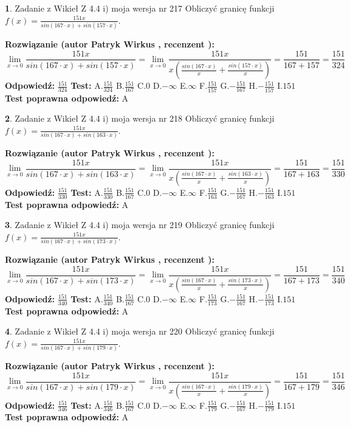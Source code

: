 \documentclass[12pt, a4paper]{article}
\theoremstyle{definition} %
\newtheorem{zad}{}
\newcommand{\zadStart}[1]{\begin{zad}#1\newline}
\newcommand{\zadStop}{\end{zad}}
\newcommand{\rozwStart}[2]{\noindent \textbf{Rozwiązanie (autor #1 , recenzent #2): }\newline}
\newcommand{\rozwStop}{\newline}
\newcommand{\odpStart}{\noindent \textbf{Odpowiedź:}\newline}
\newcommand{\odpStop}{\newline}
\newcommand{\testStart}{\noindent \textbf{Test:}\newline}
\newcommand{\testStop}{\newline}
\newcommand{\kluczStart}{\noindent \textbf{Test poprawna odpowiedź:}\newline}
\newcommand{\kluczStop}{\newline}
\begin{document}
\zadStart{Zadanie z Wikieł Z 4.4 i) moja wersja nr 217}
Obliczyć granicę funkcji $f(x)=\frac{151x}{sin(167\cdot x) +sin(157\cdot x)}$.
\zadStop
\rozwStart{Patryk Wirkus}{}
$$\lim\limits_{x\to 0}\frac{151x}{sin(167\cdot x) +sin(157\cdot x)}=\lim\limits_{x\to 0}\frac{151x}{x(\frac{sin(167\cdot x)}{x}+\frac{sin(157\cdot x)}{x})}=\frac{151}{167+157} = \frac{151}{324}$$
\rozwStop
\odpStart
$\frac{151}{324}$
\odpStop
\testStart
A.$\frac{151}{324}$
B.$\frac{151}{167}$
C.$0$
D.$-\infty$
E.$\infty$
F.$\frac{151}{157}$
G.$-\frac{151}{167}$
H.$-\frac{151}{157}$
I.$151$
\testStop
\kluczStart
A
\kluczStop



\zadStart{Zadanie z Wikieł Z 4.4 i) moja wersja nr 218}
Obliczyć granicę funkcji $f(x)=\frac{151x}{sin(167\cdot x) +sin(163\cdot x)}$.
\zadStop
\rozwStart{Patryk Wirkus}{}
$$\lim\limits_{x\to 0}\frac{151x}{sin(167\cdot x) +sin(163\cdot x)}=\lim\limits_{x\to 0}\frac{151x}{x(\frac{sin(167\cdot x)}{x}+\frac{sin(163\cdot x)}{x})}=\frac{151}{167+163} = \frac{151}{330}$$
\rozwStop
\odpStart
$\frac{151}{330}$
\odpStop
\testStart
A.$\frac{151}{330}$
B.$\frac{151}{167}$
C.$0$
D.$-\infty$
E.$\infty$
F.$\frac{151}{163}$
G.$-\frac{151}{167}$
H.$-\frac{151}{163}$
I.$151$
\testStop
\kluczStart
A
\kluczStop



\zadStart{Zadanie z Wikieł Z 4.4 i) moja wersja nr 219}
Obliczyć granicę funkcji $f(x)=\frac{151x}{sin(167\cdot x) +sin(173\cdot x)}$.
\zadStop
\rozwStart{Patryk Wirkus}{}
$$\lim\limits_{x\to 0}\frac{151x}{sin(167\cdot x) +sin(173\cdot x)}=\lim\limits_{x\to 0}\frac{151x}{x(\frac{sin(167\cdot x)}{x}+\frac{sin(173\cdot x)}{x})}=\frac{151}{167+173} = \frac{151}{340}$$
\rozwStop
\odpStart
$\frac{151}{340}$
\odpStop
\testStart
A.$\frac{151}{340}$
B.$\frac{151}{167}$
C.$0$
D.$-\infty$
E.$\infty$
F.$\frac{151}{173}$
G.$-\frac{151}{167}$
H.$-\frac{151}{173}$
I.$151$
\testStop
\kluczStart
A
\kluczStop



\zadStart{Zadanie z Wikieł Z 4.4 i) moja wersja nr 220}
Obliczyć granicę funkcji $f(x)=\frac{151x}{sin(167\cdot x) +sin(179\cdot x)}$.
\zadStop
\rozwStart{Patryk Wirkus}{}
$$\lim\limits_{x\to 0}\frac{151x}{sin(167\cdot x) +sin(179\cdot x)}=\lim\limits_{x\to 0}\frac{151x}{x(\frac{sin(167\cdot x)}{x}+\frac{sin(179\cdot x)}{x})}=\frac{151}{167+179} = \frac{151}{346}$$
\rozwStop
\odpStart
$\frac{151}{346}$
\odpStop
\testStart
A.$\frac{151}{346}$
B.$\frac{151}{167}$
C.$0$
D.$-\infty$
E.$\infty$
F.$\frac{151}{179}$
G.$-\frac{151}{167}$
H.$-\frac{151}{179}$
I.$151$
\testStop
\kluczStart
A
\kluczStop
\end{document}
